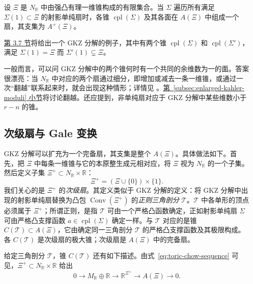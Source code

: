 \begin{theorem}\label{thm:gkz-fan}
设 $\Xi$ 是 $N_{\mathbb R}$ 中由强凸有理一维锥构成的有限集合。当 $\Sigma$ 遍历所有满足 $\Sigma(1)\subset\Xi$ 的射影单纯扇时，各锥 $\operatorname{cpl}(\Sigma)$ 及其各面在 $A(\Xi)$ 中组成一个扇，其支集为 $A^+(\Xi)$。
\end{theorem}

\hyperref[sec:toric-examples]{第 3.7 节}将给出一个 GKZ 分解的例子，其中有两个锥 $\operatorname{cpl}(\Sigma)$ 和 $\operatorname{cpl}(\Sigma')$，满足 $\Sigma(1)=\Xi$ 而 $\Sigma'(1)\subsetneq\Xi$。

一般而言，可以问 GKZ 分解中的两个锥何时有一个共同的余维数为一的面。答案很漂亮：当 $N_{\mathbb R}$ 中对应的两个扇通过细分，即增加或减去一条一维锥，或通过一次“翻越”联系起来时，就会出现这种情形；详情见 。\hyperref[subsec:enlarged-kahler-moduli]{第~\ref*{subsec:enlarged-kahler-moduli} 小节}将讨论翻越。还应提到，非单纯扇对应于 GKZ 分解中某些维数小于 $r-n$ 的锥。

\subsection{次级扇与 Gale 变换}\label{subsec:secondary-fan}

GKZ 分解可以扩充为一个完备扇，其支集是整个 $A(\Xi)$。具体做法如下。首先，把 $\Xi$ 中每条一维锥与它的本原整生成元相对应，将 $\Xi$ 视为 $N_{\mathbb R}$ 的一个子集。然后定义子集 $\Xi^+\subset N_{\mathbb R}\times\mathbb R$：
\begin{equation}\label{eq:extended-rays}
\Xi^+=(\Xi\cup\{0\})\times\{1\}.
\end{equation}
我们关心的是 $\Xi^+$ 的\emph{次级扇}。其定义类似于 GKZ 分解的定义：将 GKZ 分解中出现的射影单纯扇替换为凸包 $\operatorname{Conv}(\Xi^+)$ 的\emph{正则三角剖分} $\mathcal T$。$\mathcal T$ 中各单形的顶点必须属于 $\Xi^+$；所谓正则，是指 $\mathcal T$ 可由一个严格凸函数确定，正如射影单纯扇 $\Sigma$ 可由严格凸支撑函数 $a\in\operatorname{cpl}(\Sigma)$ 确定一样。与 $\mathcal T$ 对应的是锥 $C(\mathcal T)\subset A(\Xi)$，它由确定同一三角剖分 $\mathcal T$ 的严格凸支撑函数及其极限构成。各 $C(\mathcal T)$ 是次级扇的极大锥；次级扇是 $A(\Xi)$ 中的完备扇。

给定三角剖分 $\mathcal T$，锥 $C(\mathcal T)$ 还有如下描述。由式~\eqref{eq:toric-chow-sequence} 可见，$\Xi^+\subset N_{\mathbb R}\times\mathbb R$ 给出
\begin{equation}\label{eq:gale-exact-sequence}
0\longrightarrow M_{\mathbb R}\oplus\mathbb R
\longrightarrow\mathbb R^{\Xi^+}\longrightarrow A(\Xi)
\longrightarrow0.
\end{equation}

